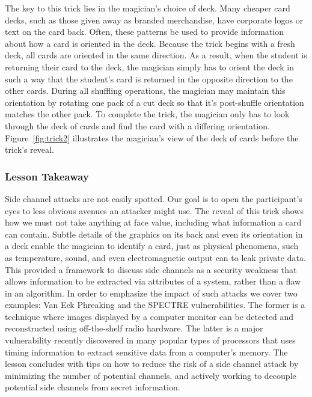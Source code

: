The key to this trick lies in the magician's choice of deck.  Many cheaper card
decks, such as those given away as branded merchandise,
have corporate logos or
text on the card back.  Often, these patterns be used to
provide information about how a card is oriented in the deck.  Because the trick
begins with a fresh deck, all cards are oriented in the same direction.  As a
result, when the student is returning their card to the deck, the magician
simply has to orient the deck in such a way that the student's card is returned
in the opposite direction to the other cards.  During all shuffling
operations, the magician may maintain this orientation by rotating one pack of a
cut deck so that it's post-shuffle orientation matches the other pack.
To complete the trick, the magician only has to look through the deck of cards
and find the card with a differing orientation.  Figure~\ref{fig:trick2}
illustrates the magician's view of the deck of cards before the trick's
reveal.

%

\subsubsection{Lesson Takeaway}

Side channel attacks are not easily spotted.  Our goal is to
open the participant's eyes to less
obvious avenues an attacker might use.
The reveal of this trick shows how we must not
take anything at face value, including what information
a card can contain.
Subtle details of the graphics on its back and even its orientation in a
deck enable the magician to identify a card, just as physical phenomena,
such as temperature, sound, and even electromagnetic output can to
leak private data.
This provided a framework
to discuss side channels
as a security weakness that allows information to
be extracted via attributes
of a system, rather than a flaw in an
algorithm.
In order to emphasize the impact of such attacks we cover two examples: Van
Eck Phreaking and the SPECTRE vulnerabilities.
The former is a technique where images displayed by a computer monitor can be
detected and reconstructed using off-the-shelf radio hardware.
The latter is a major vulnerability recently discovered in many popular
types of
processors that uses timing information to extract sensitive data from a
computer's memory.
The lesson concludes with tips on how to
reduce the risk of a side channel attack
by minimizing the number of potential channels,
and actively working to decouple potential
side channels from secret information.

